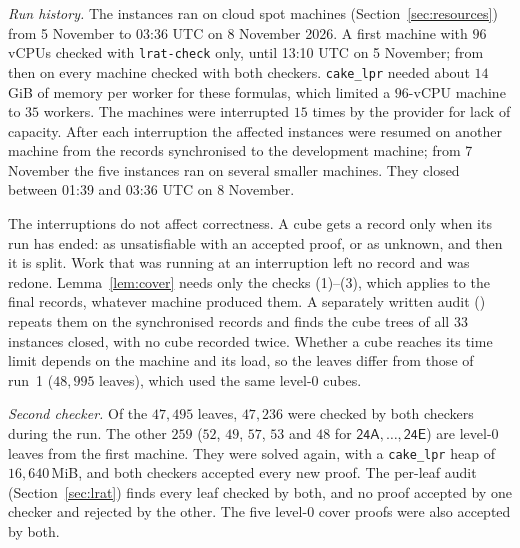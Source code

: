\documentclass[11pt]{amsart}
\theoremstyle{definition}
\theoremstyle{remark}
\newcommand{\cl}[1]{\textsf{#1}}
\begin{document}
\emph{Run history.} The instances ran on cloud spot machines
(Section~\ref{sec:resources}) from 5 November to 03:36 UTC on 8 November 2026.
A first machine with $96$ vCPUs checked with \texttt{lrat-check} only, until
13:10 UTC on 5 November; from then on every machine checked with both
checkers. \texttt{cake\_lpr} needed about $14$\,GiB of memory per worker for
these formulas, which limited a $96$-vCPU machine to $35$ workers. The
machines were interrupted $15$ times by the provider for lack of capacity.
After each interruption the affected instances were resumed on another machine
from the records synchronised to the development machine; from 7 November the
five instances ran on several smaller machines. They closed between 01:39 and
03:36 UTC on 8 November.

The interruptions do not affect correctness. A cube gets a record only when
its run has ended: as unsatisfiable with an accepted proof, or as unknown, and
then it is split. Work that was running at an interruption left no record and
was redone. Lemma~\ref{lem:cover} needs only the checks (1)--(3), which
 applies to the final records, whatever machine produced
them. A separately written audit () repeats
them on the synchronised records and finds the cube trees of all $33$
instances closed, with no cube recorded twice. Whether a cube reaches its time
limit depends on the machine and its load, so the leaves differ from those of
run~1 ($48{,}995$ leaves), which used the same level-$0$ cubes.

\emph{Second checker.} Of the $47{,}495$ leaves, $47{,}236$ were checked by both
checkers during the run. The other $259$ ($52$, $49$, $57$, $53$ and $48$ for
$\cl{24A},\dots,\cl{24E}$) are level-$0$ leaves from the first machine. They
were solved again, with a \texttt{cake\_lpr} heap of $16{,}640$\,MiB, and both
checkers accepted every new proof. The per-leaf audit
(Section~\ref{sec:lrat}) finds every leaf checked by both, and no proof
accepted by one checker and rejected by the other. The five level-$0$ cover
proofs were also accepted by both.
\end{document}
